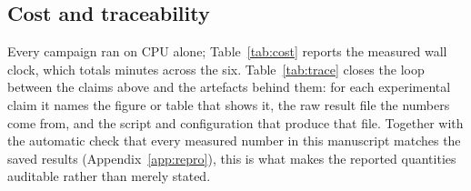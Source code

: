 \subsection{Cost and traceability}
\label{app:cost}

Every campaign ran on CPU alone; Table~\ref{tab:cost} reports the measured wall clock, which
totals \DurTotalMin{} minutes across the six. Table~\ref{tab:trace} closes the loop between the
claims above and the artefacts behind them: for each experimental claim it names the figure or
table that shows it, the raw result file the numbers come from, and the script and
configuration that produce that file. Together with the automatic check that every measured
number in this manuscript matches the saved results (Appendix~\ref{app:repro}), this is what
makes the reported quantities auditable rather than merely stated.

\begin{table}[t]
\centering
\caption{Measured computational cost, read from the run records. E1--E6 are CPU-only and hide any
accelerator that is present, so they cannot silently become irreproducible on a CPU-only machine.
E7 and E8 train on a GPU; every number this paper draws from them is then recomputed from their
saved weights on a CPU, so no claim here depends on access to an accelerator. \emph{jobs} counts
models for the GPU campaigns and configured jobs for the others. $^{\dagger}$Stage~A was resumed,
and a run record times only the final invocation, so this figure is the last leg rather than the
campaign.}
\label{tab:cost}
\small

\end{table}

\begin{table}[t]
\centering
\caption{Traceability: each experimental claim, the figure or table that shows it, the raw
result file it comes from, and the script and configuration that produce it. Reproduction
commands are in Appendix~\ref{app:repro}.}
\label{tab:trace}
\small

\end{table}

\FloatBarrier


